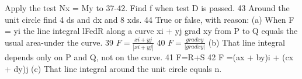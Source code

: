 Apply the test Nx = My to 37-42. Find f when test D is passed. 43 Around the unit circle find 4 ds and  dx and 8 xds.
44 True or false, with reason:
(a) When F = yi the line integral lFedR along a curve
xi + yj grad xy from P to Q equals the usual area-under the curve.
39 $F = \frac{xi+yj}{|xi+yj|}$ 40 $F = \frac{grad xy}{|grad xy|}$
(b) That line integral depends only on P and Q, not on the
curve.
41 F=R+S 42 F =(ax + by)i + (cx + dy)j (c) That line integral around the unit circle equals n. 

